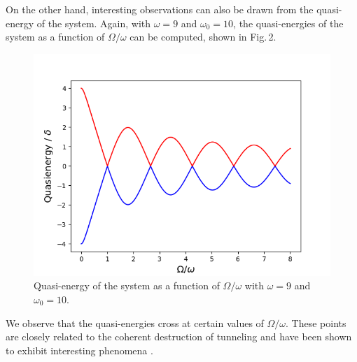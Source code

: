 \documentclass[reprint, amsmath, amssymb, aps]{revtex4-2}
\begin{document}
On the other hand, interesting observations can also be drawn from the quasi-energy of the system. Again, with $\omega = 9$ and $\omega_0= 10$, the quasi-energies of the system as a function of $\Omega/ \omega$ can be computed, shown in Fig.\,2. 
\begin{figure}
\includegraphics[scale=0.45]{F3}
\caption{Quasi-energy of the system as a function of $\Omega/\omega $ with $\omega = 9$ and $\omega_0= 10$. }
\end{figure}
We observe that the quasi-energies cross at certain values of $\Omega/ \omega$. These points are closely related to the coherent destruction of tunneling and have been shown to exhibit interesting phenomena \cite{QuTiP, Grossmann, Miao, Kayanuma}. \\
\end{document}
